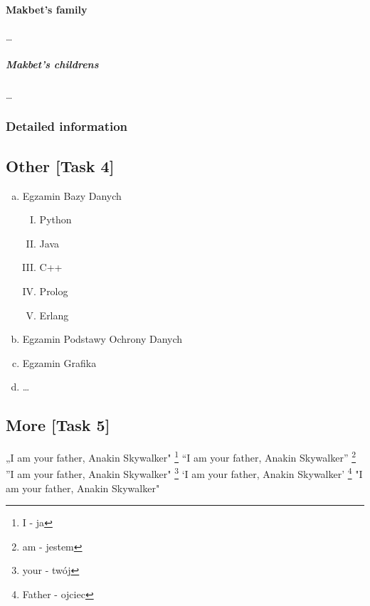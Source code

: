\documentclass[12pt, letterpaper, twoside]{article}
\begin{document}
\paragraph{Makbet's family}
\ldots
\subparagraph{Makbet's childrens}
\ldots
\subsubsection{Detailed information}

\subsection{Other [Task 4]}
\begin{enumerate}[a)]
    \item Egzamin Bazy Danych
\begin{enumerate}[I.]
    \item Python
    \item Java
    \item C++
    \item Prolog
    \item Erlang
    
\end{enumerate}

    \item Egzamin Podstawy Ochrony Danych
    \item Egzamin Grafika
    \item \ldots

\end{enumerate}

\subsection{More [Task 5]}
„I am your father, Anakin Skywalker"
\footnote{I - ja}
\newline
``I am your father, Anakin Skywalker''
\footnote{am - jestem}
\newline
''I am your father, Anakin Skywalker"
\footnote{your - twój}
\newline
`I am your father, Anakin Skywalker'
\footnote{Father - ojciec}
\newline
"I am your father, Anakin Skywalker"
\end{document}

